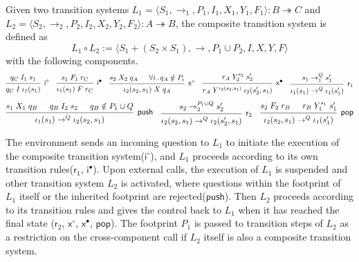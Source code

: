 \documentclass[sigplan,10pt,review,anonymous]{acmart}
\newcommand{\kw}[1]{\ensuremath{\mathsf{#1}}}
\begin{document}
\begin{definition} \label{def:lts-comp}
Given two transition systems
$L_1 = \langle S_1, {\rightarrow_1}, P_1, I_1, X_1, Y_1, F_1 \rangle
: B \twoheadrightarrow C$ and
$L_2 = \langle S_2, {\rightarrow_2}, P_2, I_2, X_2, Y_2, F_2 \rangle
: A \twoheadrightarrow B$,
the composite transition system is defined as
\[
  L_1 \circ L_2 :=
  \langle S_1 + (S_2 \times S_1), {\rightarrow}, P_1 \cup P_2, I, X, Y, F \rangle
\]
with the following components.
\[
  \begin{prooftree}
    \hypo{q_C \mathrel{I_1} s_1}
    \infer1[$\kw{i}^\circ$]{q_C \mathrel{I} \iota_1(s_1)}
  \end{prooftree}
  \quad
  \begin{prooftree}
    \hypo{s_1 \mathrel{F_1} r_C}
    \infer1[$\kw{i}^\bullet$]{\iota_1(s_1) \mathrel{F} r_C}
  \end{prooftree}
  \quad
  \begin{prooftree}
    \hypo{s_2 \mathrel{X_2} q_A}
    \hypo{\forall i\,.\, q_A \notin P_i}
    \infer2[$\kw{x}^\circ$]{\iota_2(s_2, s_1) \mathrel{X} q_A}
  \end{prooftree}
  \quad
  \begin{prooftree}
    \hypo{r_A \mathrel{Y_2^{s_2}} s_2'}
    \infer1[$\kw{x}^\bullet$]{r_A \mathrel{Y^{\iota_2(s_2, s_1)}} \iota_2(s_2', s_1)}
  \end{prooftree}
  \quad
  \begin{prooftree}
    \hypo{s_1 \rightarrow_1^Q s_1'}
    \infer1[$\kw{r}_1$]{\iota_1(s_1) \rightarrow^Q \iota_1(s_1')}
  \end{prooftree}
\]
\[
  \begin{prooftree}
    \hypo{s_1 \mathrel{X_1} q_B}
    \hypo{q_B \mathrel{I_2} s_2}
    \hypo{q_B \notin P_1 \cup Q}
    \infer3[\kw{push}]{\iota_1(s_1) \rightarrow^Q \iota_2(s_2, s_1)}
  \end{prooftree}
  \quad
  \begin{prooftree}
    \hypo{s_2 \rightarrow_2^{P_1 \cup Q} s_2'}
    \infer1[$\kw{r}_2$]{\iota_2(s_2, s_1) \rightarrow^Q \iota_2(s_2', s_1)}
  \end{prooftree}
  \quad
  \begin{prooftree}
    \hypo{s_2 \mathrel{F_2} r_B}
    \hypo{r_B \mathrel{Y_1^{s_1}} s_1'}
    \infer2[\kw{pop}]{\iota_2(s_2, s_1) \rightarrow^Q \iota_1(s_1')}
  \end{prooftree}
\]
\end{definition}
The environment sends an incoming question to $L_1$ to initiate the execution of
the composite transition system($\kw{i}^\circ$), and $L_1$ proceeds according to
its own transition rules($\kw{r}_1$, $\kw{i}^\bullet$). Upon external calls, the
execution of $L_1$ is suspended and other transition system $L_2$ is activated,
where questions within the footprint of $L_1$ itself or the inherited footprint
are rejected($\kw{push}$). Then $L_2$ proceeds according to its transition rules
and gives the control back to $L_1$ when it has reached the final state
($\kw{r}_2$, $\kw{x}^\circ$, $\kw{x}^\bullet$, $\kw{pop}$). The footprint $P_1$
is passed to transition steps of $L_2$ as a restriction on the cross-component
call if $L_2$ itself is also a composite transition system.
\end{document}

